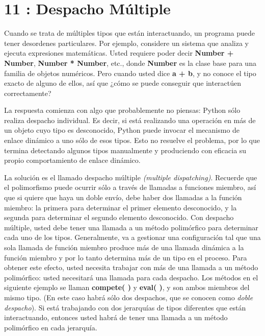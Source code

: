 \section*{11 : Despacho Múltiple}
\label{sec:dm}

Cuando se trata de múltiples tipos que están interactuando, un programa puede tener desordenes particulares. Por ejemplo, considere un sistema que analiza y ejecuta expresiones matemáticas. Usted requiere poder decir \textbf{Number + Number}, \textbf{Number * Number}, etc., donde \textbf{Number} es la clase base para una familia de objetos numéricos. Pero cuando usted dice \textbf{a + b}, y no conoce el tipo exacto de alguno de ellos, así que ¿cómo se puede conseguir que interactúen correctamente?  \newline

La respuesta comienza con algo que probablemente no piensas: Python sólo realiza despacho individual. Es decir, si está realizando una operación en más de un objeto cuyo tipo es desconocido, Python puede invocar el mecanismo de enlace dinámico a uno sólo de esos tipos. Esto no resuelve el problema, por lo que termina detectando algunos tipos manualmente y produciendo con eficacia su propio comportamiento de enlace dinámico.   \newline

La solución es el llamado despacho múltiple \textit{(multiple dispatching)}. Recuerde que el polimorfismo puede ocurrir sólo a través de llamadas a funciones miembro, así que si quiere que haya un doble envío, debe haber dos llamadas a la función miembro: la primera para determinar el primer elemento desconocido, y la segunda para determinar el segundo elemento desconocido. Con despacho múltiple, usted debe tener una llamada a un método polimórfico para determinar cada uno de los tipos. Generalmente, va a gestionar una configuración tal que una sola llamada de función miembro produce más de una llamada dinámica a la función miembro y por lo tanto determina más de un tipo en el proceso. Para obtener este efecto, usted necesita trabajar con más de una llamada a un método polimórfico: usted necesitará una llamada para cada despacho. Los métodos en el siguiente ejemplo se llaman \textbf{compete( )} y \textbf{eval( )}, y son ambos miembros del mismo tipo. (En este caso habrá sólo dos despachos, que se conocen como \textit{doble despacho}). Si está trabajando con dos jerarquías de tipos diferentes que están interactuando, entonces usted habrá de tener una llamada a un método polimórfico en cada jerarquía.  \newline

